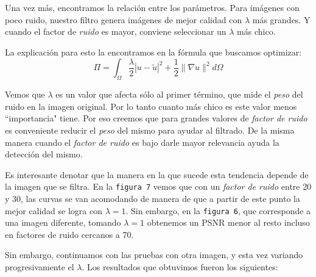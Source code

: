 \documentclass[a4paper]{article}
\begin{document}
Una vez más, encontramos la relación entre los parámetros. Para imágenes con poco ruido, nuestro filtro genera imágenes de mejor calidad con $\lambda$ más grandes. Y cuando el factor de \textit{ruido} es mayor, conviene seleccionar un $\lambda$ más chico.

La explicación para esto la encontramos en la fórmula que buscamos optimizar:
$$  \Pi = \int_\Omega {\frac{\lambda}{2} \left| u - \tilde{u} \right|^2 + \frac{1}{2} \lVert \nabla u \rVert^2 } d\Omega$$

Vemos que $\lambda$ es un valor que afecta sólo al primer término, que mide el \textit{peso} del ruido en la imagen original. Por lo tanto cuanto más chico es este valor menos ``importancia" tiene. Por eso creemos que para grandes valores de \textit{factor de ruido} es conveniente reducir el \textit{peso} del mismo para ayudar al filtrado. De la misma manera cuando el \textit{factor de ruido} es bajo darle mayor relevancia ayuda la detección del mismo.

Es interesante denotar que la manera en la que sucede esta tendencia depende de la imagen que se filtra. En la \texttt{figura 7} vemos que con un \textit{factor de ruido} entre 20 y 30, las curvas se van acomodando de manera de que a partir de este punto la mejor calidad se logra con $\lambda = 1$. Sin embargo, en la \texttt{figura 6}, que corresponde a una imagen diferente, tomando $\lambda = 1$ obtenemos un PSNR menor al resto incluso en factores de ruido cercanos a 70.

Sin embargo, continuamos con las pruebas con otra imagen, y esta vez variando progresivamente el $\lambda$. Los resultados que obtuvimos fueron los siguientes: 
\end{document}

